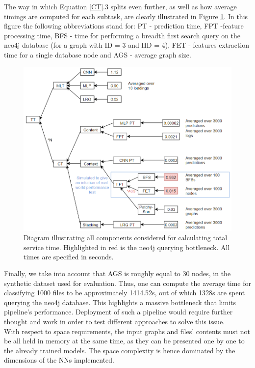     The way in which Equation \ref{CT}.3 splits even further, as well as how average timings are computed for each subtask, are clearly illustrated in Figure \ref{timings}. In this figure the following abbreviations stand for: PT - prediction time, FPT -feature processing time, BFS - time for performing a breadth first search query on the neo4j database (for a graph with ID = 3 and HD = 4), FET - features extraction time for a single database node and AGS - average graph size. \\
    
\begin{figure}[H]
  \centering
  \centerline{\includegraphics[scale=0.6]{Images/timings.png}}
  \caption{Diagram illustrating all components considered for calculating total service time. Highlighted in red is the neo4j querying bottleneck. All times are specified in seconds.}
  \label{timings}
\end{figure}

Finally, we take into account that AGS is roughly equal to 30 nodes, in the synthetic dataset used for evaluation. Thus, one can compute the average time for classifying 1000 files to be approximately 1414.52s, out of which 1328s are spent querying the neo4j database. This highlights a massive bottleneck that limits pipeline's performance. Deployment of such a pipeline would require further thought and work in order to test different approaches to solve this issue. \\

With respect to space requirements, the input graphs and files' contents must not be all held in memory at the same time, as they can be presented one by one to the already trained models. The space complexity is hence dominated by the dimensions of the NNs implemented. \\

